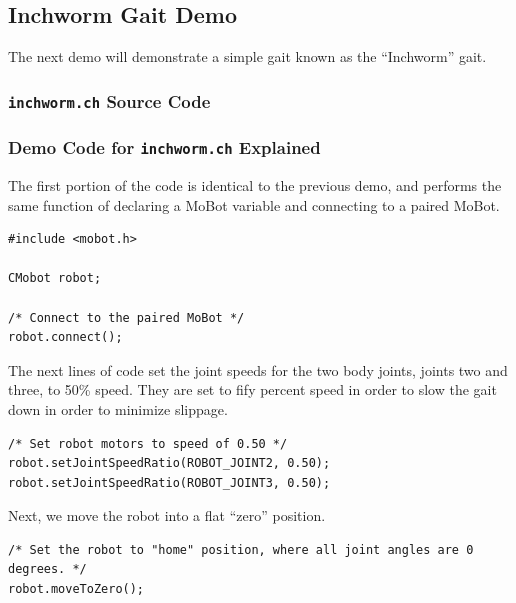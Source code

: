 \documentclass{article}
\begin{document}
\subsection{Inchworm Gait Demo}
The next demo will demonstrate a simple gait known as the ``Inchworm'' gait.

\subsubsection{\texttt{inchworm.ch} Source Code}


\subsubsection{Demo Code for \texttt{inchworm.ch} Explained}
The first portion of the code is identical to the previous demo, and performs
the same function of declaring a MoBot variable and connecting to a 
paired MoBot.
\begin{verbatim}
#include <mobot.h>

CMobot robot;

/* Connect to the paired MoBot */
robot.connect();
\end{verbatim}

The next lines of code set the joint speeds for the two body joints, joints 
two and three, to 50\% speed. They are set to fify percent speed in order to 
slow the gait down in order to minimize slippage.

\begin{verbatim}
/* Set robot motors to speed of 0.50 */
robot.setJointSpeedRatio(ROBOT_JOINT2, 0.50);
robot.setJointSpeedRatio(ROBOT_JOINT3, 0.50);
\end{verbatim}

Next, we move the robot into a flat ``zero'' position.

\begin{verbatim}
/* Set the robot to "home" position, where all joint angles are 0 degrees. */
robot.moveToZero();
\end{verbatim}
\end{document}
